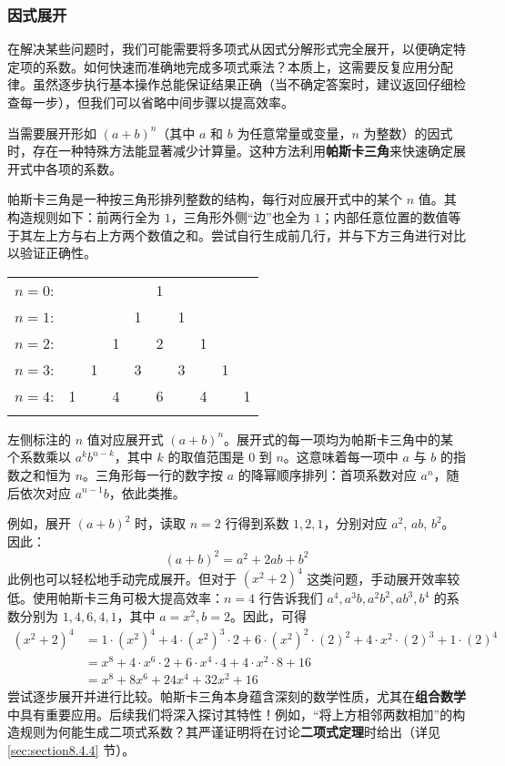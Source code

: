 \subsubsection*{因式展开}

在解决某些问题时，我们可能需要将多项式从因式分解形式完全展开，以便确定特定项的系数。如何快速而准确地完成多项式乘法？本质上，这需要反复应用分配律。虽然逐步执行基本操作总能保证结果正确（当不确定答案时，建议返回仔细检查每一步），但我们可以省略中间步骤以提高效率。

当需要展开形如 $(a+b)^n$（其中 $a$ 和 $b$ 为任意常量或变量，$n$ 为整数）的因式时，存在一种特殊方法能显著减少计算量。这种方法利用\textbf{帕斯卡三角}来快速确定展开式中各项的系数。

帕斯卡三角是一种按三角形排列整数的结构，每行对应展开式中的某个 $n$ 值。其构造规则如下：前两行全为 $1$，三角形外侧``边''也全为 $1$；内部任意位置的数值等于其左上方与右上方两个数值之和。尝试自行生成前几行，并与下方三角进行对比以验证正确性。

\begin{center}
    \begin{tabular}{rccccccccc}
        $n=0$: &    &    &    &    &  1\\\noalign{\smallskip\smallskip}
        $n=1$: &    &    &    &  1 &    &  1\\\noalign{\smallskip\smallskip}
        $n=2$: &    &    &  1 &    &  2 &    &  1\\\noalign{\smallskip\smallskip}
        $n=3$: &    &  1 &    &  3 &    &  3 &    &  1\\\noalign{\smallskip\smallskip}
        $n=4$: &  1 &    &  4 &    &  6 &    &  4 &    &  1\\\noalign{\smallskip\smallskip}
    \end{tabular}
\end{center}

左侧标注的 $n$ 值对应展开式 $(a+b)^n$。展开式的每一项均为帕斯卡三角中的某个系数乘以 $a^kb^{n-k}$，其中 $k$ 的取值范围是 $0$ 到 $n$。这意味着每一项中 $a$ 与 $b$ 的指数之和恒为 $n$。三角形每一行的数字按 $a$ 的降幂顺序排列：首项系数对应 $a^n$，随后依次对应 $a^{n-1}b$，依此类推。

例如，展开 $(a + b)^2$ 时，读取 $n=2$ 行得到系数 $1, 2, 1$，分别对应 $a^2$, $ab$, $b^2$。因此：
\[(a + b)^2 = a^2 + 2ab + b^2\]
此例也可以轻松地手动完成展开。但对于 $(x^2+2)^4$ 这类问题，手动展开效率较低。使用帕斯卡三角可极大提高效率：$n = 4$ 行告诉我们 $a^4, a^3b, a^2b^2, ab^3, b^4$ 的系数分别为 $1, 4, 6, 4, 1$，其中 $a = x^2, b = 2$。因此，可得
\begin{align*}
    (x^2+2)^4 &=  1 \cdot (x^2)^4 + 4 \cdot (x^2)^3 \cdot 2 + 6 \cdot (x^2)^2 \cdot (2)^2 + 4 \cdot x^2 \cdot (2)^3 + 1 \cdot (2)^4 \\
    &=  x^8 + 4 \cdot x^6 \cdot 2 + 6 \cdot x^4 \cdot 4 + 4 \cdot x^2 \cdot 8 + 16 \\
    &= x^8 + 8x^6 + 24x^4 + 32x^2 + 16
\end{align*}
尝试逐步展开并进行比较。帕斯卡三角本身蕴含深刻的数学性质，尤其在\textbf{组合数学}中具有重要应用。后续我们将深入探讨其特性！例如，``将上方相邻两数相加''的构造规则为何能生成二项式系数？其严谨证明将在讨论\textbf{二项式定理}时给出（详见 \ref{sec:section8.4.4} 节）。


